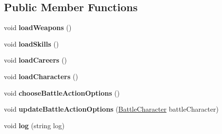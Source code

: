 \subsection*{Public Member Functions}
\begin{DoxyCompactItemize}
\item 
void {\bfseries load\+Weapons} ()\hypertarget{classdoki_battle_1_1_battle_manager_ad696dbd000d9ff3680fe4ea1b74762d7}{}\label{classdoki_battle_1_1_battle_manager_ad696dbd000d9ff3680fe4ea1b74762d7}

\item 
void {\bfseries load\+Skills} ()\hypertarget{classdoki_battle_1_1_battle_manager_a2d86ccc7da36c73e19beb187307d5ef2}{}\label{classdoki_battle_1_1_battle_manager_a2d86ccc7da36c73e19beb187307d5ef2}

\item 
void {\bfseries load\+Careers} ()\hypertarget{classdoki_battle_1_1_battle_manager_ab27421f1250e7336c66f5854fcb2ea53}{}\label{classdoki_battle_1_1_battle_manager_ab27421f1250e7336c66f5854fcb2ea53}

\item 
void {\bfseries load\+Characters} ()\hypertarget{classdoki_battle_1_1_battle_manager_a9166d7a8bd865d45c37a171efd59de86}{}\label{classdoki_battle_1_1_battle_manager_a9166d7a8bd865d45c37a171efd59de86}

\item 
void {\bfseries choose\+Battle\+Action\+Options} ()\hypertarget{classdoki_battle_1_1_battle_manager_aa9e22e53505728192034d67aa070b085}{}\label{classdoki_battle_1_1_battle_manager_aa9e22e53505728192034d67aa070b085}

\item 
void {\bfseries update\+Battle\+Action\+Options} (\hyperlink{classdoki_battle_1_1_battle_character}{Battle\+Character} battle\+Character)\hypertarget{classdoki_battle_1_1_battle_manager_a9848cf779aec567b794845bad9afde3e}{}\label{classdoki_battle_1_1_battle_manager_a9848cf779aec567b794845bad9afde3e}

\item 
void {\bfseries log} (string log)\hypertarget{classdoki_battle_1_1_battle_manager_a9f37a55e06170268752878dc02f0decd}{}\label{classdoki_battle_1_1_battle_manager_a9f37a55e06170268752878dc02f0decd}

\end{DoxyCompactItemize}
